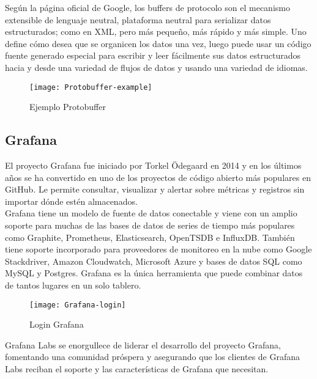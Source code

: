 \documentclass[ spanish, a4paper, 12pt, oneside]{report}
\begin{document}
Según la página oficial de Google, los buffers de protocolo son el mecanismo extensible de lenguaje neutral, plataforma neutral para serializar datos estructurados; como en XML, pero más pequeño, más rápido y más simple. Uno define cómo desea que se 
organicen los datos una vez, luego puede usar un código fuente generado especial para escribir y leer fácilmente sus datos estructurados hacia y desde una variedad de flujos de datos y usando una variedad de idiomas. \\

\begin{figure}[!h]
   \centering
   \texttt{[image: Protobuffer-example]}\\
      \caption{\label{fig: Protobuffer example} Ejemplo Protobuffer}
\end{figure}

\subsection{Grafana}
El proyecto Grafana fue iniciado por Torkel Ödegaard en 2014 y en los últimos años se ha convertido en uno de los proyectos de código abierto más populares en GitHub. Le permite consultar, visualizar y alertar sobre métricas y registros sin importar 
dónde estén almacenados. \\

Grafana tiene un modelo de fuente de datos conectable y viene con un amplio soporte para muchas de las bases de datos de series de tiempo más populares como Graphite, Prometheus, Elasticsearch, OpenTSDB e InfluxDB. También tiene soporte incorporado 
para proveedores de monitoreo en la nube como Google Stackdriver, Amazon Cloudwatch, Microsoft Azure y bases de datos SQL como MySQL y Postgres. Grafana es la única herramienta que puede combinar datos de tantos lugares en un solo tablero. \\

\begin{figure}[!h]
   \centering
   \texttt{[image: Grafana-login]}\\
      \caption{\label{fig: Login Grafana} Login Grafana}
\end{figure}

Grafana Labs se enorgullece de liderar el desarrollo del proyecto Grafana, fomentando una comunidad próspera y asegurando que los clientes de Grafana Labs reciban el soporte y las características de Grafana que necesitan. \\
\end{document}
